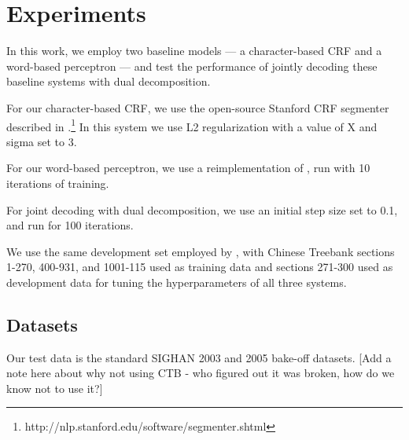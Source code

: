 \section{Experiments}

In this work, we employ two baseline models --- a character-based CRF and a word-based perceptron --- and test the performance of jointly decoding these baseline systems with dual decomposition. 

For our character-based CRF, we use the open-source Stanford CRF segmenter described in \cite{Tseng:2005:SIGHAN}.\footnote{http://nlp.stanford.edu/software/segmenter.shtml} In this system we use L2 regularization with a value of X %
and sigma set to 3.

For our word-based perceptron, we use a reimplementation of \cite{Zhang:2007:ACL}, run with 10 iterations of training.

For joint decoding with dual decomposition, we use an initial step size set to 0.1, and run for 100 iterations.

We use the same development set employed by \cite{Zhang:2007:ACL}, with Chinese Treebank sections 1-270, 400-931, and 1001-115 used as training data and sections 271-300 used as development data for tuning the hyperparameters of all three systems.

\subsection{Datasets}
Our test data is the standard SIGHAN 2003 \cite{Sproat:2003:SIGHAN} and 2005 \cite{Emerson:2005:SIGHAN} bake-off datasets. [Add a note here about why not using CTB - who figured out it was broken, how do we know not to use it?]



